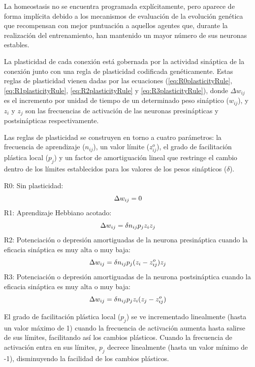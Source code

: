 La homeostasis no se encuentra programada explícitamente, pero aparece de forma implícita debido a los mecanismos de evaluación de la evolución genética que recompensan con mejor puntuación a aquellos
agentes que, durante la realización del entrenamiento, han mantenido un mayor número de sus neuronas estables.

La plasticidad de cada conexión está gobernada por la actividad sináptica de la conexión junto con una regla de plasticidad codificada genéticamente. Estas reglas de plasticidad vienen dadas por las
ecuaciones (\ref{eq:R0plasticityRule}, \ref{eq:R1plasticityRule}, \ref{eq:R2plasticityRule} y \ref{eq:R3plasticityRule}), donde $\Delta w_{ij}$ es el incremento por unidad de tiempo de un determinado peso sináptico ($w_{ij}$), y $z_{i}$ y $z_{j}$ son las frecuencias de
activación de las neuronas presinápticas y postsinápticas respectivamente.

Las reglas de plasticidad se construyen en torno a cuatro parámetros: la frecuencia de aprendizaje ($n_{ij}$), un valor límite ($z_{ij}^{o}$), el grado de facilitación plástica local ($p_{j}$) y
un factor de amortiguación lineal que restringe el cambio dentro de los límites establecidos para los valores de los pesos sinápticos ($\delta$).

\noindent
R0: Sin plasticidad:
\begin{equation} \label{eq:R0plasticityRule}
 \centering
 \Delta w_{ij}= 0
\end{equation}
\noindent
R1: Aprendizaje Hebbiano acotado:
\begin{equation} \label{eq:R1plasticityRule}
 \centering
 \Delta w_{ij}= \delta n_{ij} p_{j} z_{i} z_{j}
\end{equation}
\noindent
R2: Potenciación o depresión amortiguadas de la neurona presináptica cuando la eficacia sináptica es muy alta o muy baja:
\begin{equation} \label{eq:R2plasticityRule}
 \centering
 \Delta w_{ij}= \delta n_{ij} p_{j} (z_{i} - z_{ij}^{o}) z_{j}
\end{equation}
\noindent
R3: Potenciación o depresión amortiguadas de la neurona postsináptica cuando la eficacia sináptica es muy alta o muy baja:
\begin{equation} \label{eq:R3plasticityRule}
 \centering
 \Delta w_{ij}= \delta n_{ij} p_{j} z_{i} (z_{j} - z_{ij}^{o})
\end{equation}

El grado de facilitación plástica local ($p_{j}$) se ve incrementado linealmente (hasta un valor máximo de 1) cuando la frecuencia de activación aumenta hasta salirse de sus límites, facilitando
así los cambios plásticos. Cuando la frecuencia de activación entra en sus límites, $p_{j}$ decrece linealmente (hasta un valor mínimo de -1), disminuyendo la facilidad de los cambios plásticos.


